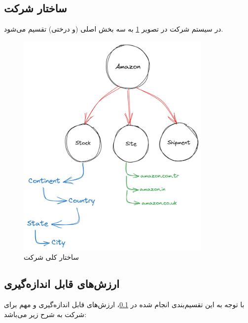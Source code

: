 \documentclass[12pt, dvipsnames, svgnames, x11names,]{article}
\begin{document}
\subsection{ساختار شرکت}\label{amz-struct}
در سیستم  شرکت  در تصویر \ref{amz-s3} به سه بخش اصلی (و درختی) تقسیم می‌شود.
\begin{figure}[b]
\begin{center}
    \includegraphics[width=0.85\textwidth, height=0.75\textheight]{../images/amazon-s3-comp(2)}
\end{center} 
\caption{ساختار کلی شرکت }\label{amz-s3}
\end{figure}

\subsection{ارزش‌های قابل‌ اندازه‌گیری}\label{intro-movs}
با توجه به این تقسیم‌بندی انجام شده در \ref{amz-struct}، ارزش‌های قابل‌ اندازه‌گیری \label{movs}
و مهم برای شرکت  به شرح زیر می‌باشد:
\end{document}
